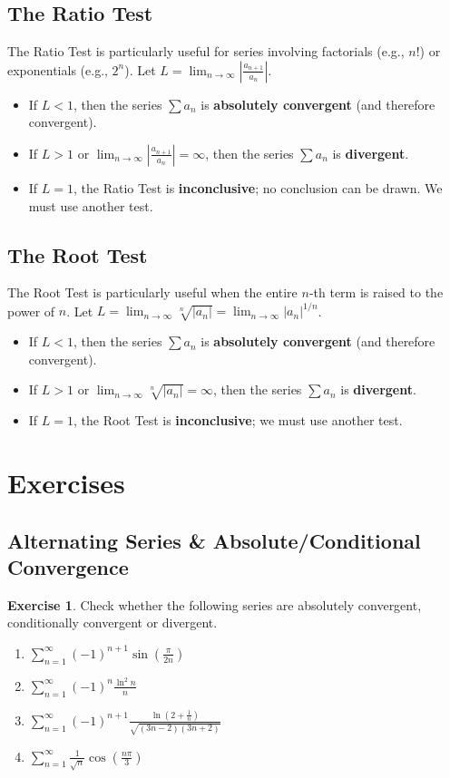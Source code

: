 \documentclass[11pt]{article}
\theoremstyle{definition}
\newtheorem{exercise}{Exercise}[section]
\begin{document}
\subsection{The Ratio Test}
The Ratio Test is particularly useful for series involving factorials (e.g., $n!$) or exponentials (e.g., $2^n$).
Let $L = \lim_{n \to \infty} \left| \frac{a_{n+1}}{a_n} \right|$.
\begin{itemize}
    \item If $L < 1$, then the series $\sum a_n$ is \textbf{absolutely convergent} (and therefore convergent).
    \item If $L > 1$ or $\lim_{n \to \infty} \left| \frac{a_{n+1}}{a_n} \right| = \infty$, then the series $\sum a_n$ is \textbf{divergent}.
    \item If $L = 1$, the Ratio Test is \textbf{inconclusive}; no conclusion can be drawn. We must use another test.
\end{itemize}

\subsection{The Root Test}
The Root Test is particularly useful when the entire $n$-th term is raised to the power of $n$.
Let $L = \lim_{n \to \infty} \sqrt[n]{|a_n|} = \lim_{n \to \infty} |a_n|^{1/n}$.
\begin{itemize}
    \item If $L < 1$, then the series $\sum a_n$ is \textbf{absolutely convergent} (and therefore convergent).
    \item If $L > 1$ or $\lim_{n \to \infty} \sqrt[n]{|a_n|} = \infty$, then the series $\sum a_n$ is \textbf{divergent}.
    \item If $L = 1$, the Root Test is \textbf{inconclusive}; we must use another test.
\end{itemize}

\section{Exercises}

\subsection{Alternating Series \& Absolute/Conditional Convergence}

\begin{exercise}
Check whether the following series are absolutely convergent, conditionally convergent or divergent.
\begin{enumerate}
    \item $\displaystyle \sum_{n=1}^{\infty} (-1)^{n+1}\sin\left(\frac{\pi}{2n}\right)$
    \item $\displaystyle \sum_{n=1}^{\infty} (-1)^n\frac{\ln^2 n}{n}$
    \item $\displaystyle \sum_{n=1}^{\infty} (-1)^{n+1}\frac{\ln(2+\frac{1}{n})}{\sqrt{(3n-2)(3n+2)}}$
    \item $\displaystyle \sum_{n=1}^{\infty} \frac{1}{\sqrt{n}}\cos\left(\frac{n\pi}{3}\right)$
\end{enumerate}
\end{exercise}
\end{document}
